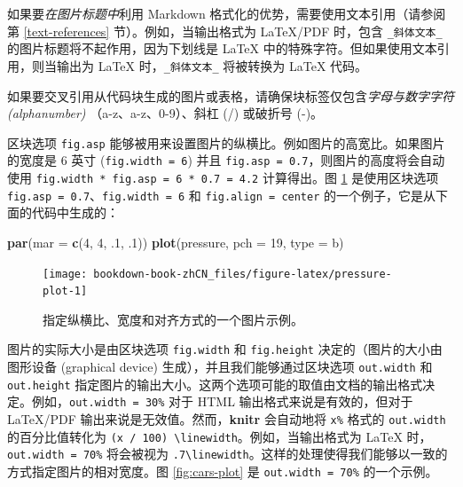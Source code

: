 \documentclass[
  12pt,
]{krantz}
\makeatletter
\newenvironment{Shaded}{\begin{snugshade}}{\end{snugshade}}
\newcommand{\AttributeTok}[1]{\textcolor[rgb]{0.13,0.29,0.53}{#1}}
\newcommand{\DecValTok}[1]{\textcolor[rgb]{0.00,0.00,0.81}{#1}}
\newcommand{\FunctionTok}[1]{\textcolor[rgb]{0.13,0.29,0.53}{\textbf{#1}}}
\newcommand{\NormalTok}[1]{#1}
\newcommand{\StringTok}[1]{\textcolor[rgb]{0.31,0.60,0.02}{#1}}
\newenvironment{kframe}{%
\medskip{}
\setlength{\fboxsep}{.8em}
 \def\at@end@of@kframe{}%
 \ifinner\ifhmode%
  \def\at@end@of@kframe{\end{minipage}}%
  \begin{minipage}{\columnwidth}%
 \fi\fi%
 \def\FrameCommand##1{\hskip\@totalleftmargin \hskip-\fboxsep
 \colorbox{shadecolor}{##1}\hskip-\fboxsep
     \hskip-\linewidth \hskip-\@totalleftmargin \hskip\columnwidth}%
 \MakeFramed {\advance\hsize-\width
   \@totalleftmargin\z@ \linewidth\hsize
   \@setminipage}}%
 {\par\unskip\endMakeFramed%
 \at@end@of@kframe}
\newenvironment{rmdblock}[1]
  {
  \begin{itemize}
  \renewcommand{\labelitemi}{
    \raisebox{-.7\height}[0pt][0pt]{
      {\setkeys{Gin}{width=3em,keepaspectratio}\texttt{[image: images/\#1]}}
    }
  }
  \setlength{\fboxsep}{1em}
  \begin{kframe}
  \item
  }
  {
  \end{kframe}
  \end{itemize}
  }
\newenvironment{rmdimportant}
  {\begin{rmdblock}{important}}
  {\end{rmdblock}}
\theoremstyle{definition}
\theoremstyle{definition}
\theoremstyle{definition}
\theoremstyle{definition}
\theoremstyle{remark}
\makeatother
\begin{document}
如果要\emph{在图片标题中}利用 Markdown 格式化的优势，需要使用文本引用（请参阅第 \ref{text-references} 节）。例如，当输出格式为 LaTeX/PDF 时，包含 \texttt{\_斜体文本\_} 的图片标题将不起作用，因为下划线是 LaTeX 中的特殊字符。但如果使用文本引用，则当输出为 LaTeX 时，\texttt{\_斜体文本\_} 将被转换为 LaTeX 代码。

\begin{rmdimportant}
如果要交叉引用从代码块生成的图片或表格，请确保块标签仅包含\emph{字母与数字字符 (alphanumber)} （a-z、a-z、0-9）、斜杠 (/) 或破折号 (-)。
\end{rmdimportant}

区块选项 \texttt{fig.asp} 能够被用来设置图片的纵横比。例如图片的高宽比。如果图片的宽度是 6 英寸 (\texttt{fig.width\ =\ 6}) 并且 \texttt{fig.asp\ =\ 0.7}，则图片的高度将会自动使用 \texttt{fig.width\ *\ fig.asp\ =\ 6\ *\ 0.7\ =\ 4.2} 计算得出。图 \ref{fig:pressure-plot} 是使用区块选项 \texttt{fig.asp\ =\ 0.7}、\texttt{fig.width\ =\ 6} 和 \texttt{fig.align\ =\ \textquotesingle{}center\textquotesingle{}} 的一个例子，它是从下面的代码中生成的：

\begin{Shaded}
\begin{Highlighting}[]
\FunctionTok{par}\NormalTok{(}\AttributeTok{mar =} \FunctionTok{c}\NormalTok{(}\DecValTok{4}\NormalTok{, }\DecValTok{4}\NormalTok{, .}\DecValTok{1}\NormalTok{, .}\DecValTok{1}\NormalTok{))}
\FunctionTok{plot}\NormalTok{(pressure, }\AttributeTok{pch =} \DecValTok{19}\NormalTok{, }\AttributeTok{type =} \StringTok{\textquotesingle{}b\textquotesingle{}}\NormalTok{)}
\end{Highlighting}
\end{Shaded}

\begin{figure}

{\centering \texttt{[image: bookdown-book-zhCN\_files/figure-latex/pressure-plot-1]} 

}

\caption{指定纵横比、宽度和对齐方式的一个图片示例。}\label{fig:pressure-plot}
\end{figure}

图片的实际大小是由区块选项 \texttt{fig.width} 和 \texttt{fig.height} 决定的（图片的大小由图形设备 (graphical device) 生成），并且我们能够通过区块选项 \texttt{out.width} 和 \texttt{out.height} 指定图片的输出大小。这两个选项可能的取值由文档的输出格式决定。例如，\texttt{out.width\ =\ \textquotesingle{}30\%\textquotesingle{}} 对于 HTML 输出格式来说是有效的，但对于 LaTeX/PDF 输出来说是无效值。然而，\textbf{knitr} 会自动地将 \texttt{x\%} 格式的 \texttt{out.width} 的百分比值转化为 \texttt{(x\ /\ 100)\ \textbackslash{}linewidth}。例如，当输出格式为 LaTeX 时，\texttt{out.width\ =\ \textquotesingle{}70\%\textquotesingle{}} 将会被视为 \texttt{.7\textbackslash{}linewidth}。这样的处理使得我们能够以一致的方式指定图片的相对宽度。图 \ref{fig:cars-plot} 是 \texttt{out.width\ =\ 70\%} 的一个示例。
\end{document}

